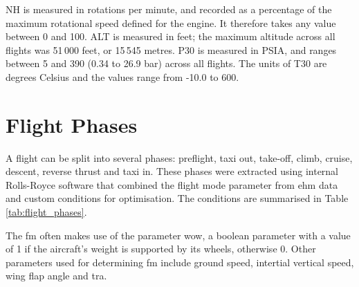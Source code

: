 NH is measured in rotations per minute, and recorded as a percentage of the maximum rotational speed defined for the engine. It therefore takes any value between 0 and 100. ALT is measured in feet; the maximum altitude across all flights was 51\,000 feet, or 15\,545 metres. P30 is measured in PSIA, and ranges between 5 and 390 (0.34 to 26.9 bar) across all flights. The units of T30 are degrees Celsius and the values range from -10.0 to 600.

\section{Flight Phases} \label{sec:phases}
A flight can be split into several phases: preflight, taxi out, take-off, climb, cruise, descent, reverse thrust and taxi in. These phases were extracted using internal Rolls-Royce software \cite[]{konig_br725stats_2018} that combined the flight mode parameter from \ac{ehm} data \cite[]{reischl_br700-725a1-12_2014} and custom conditions for optimisation. The conditions are summarised in Table \ref{tab:flight_phases}.

The \ac{fm} often makes use of the parameter \ac{wow}, a boolean parameter with a value of 1 if the aircraft's weight is supported by its wheels, otherwise 0. Other parameters used for determining \ac{fm} include ground speed, intertial vertical speed, wing flap angle and \ac{tra}.

